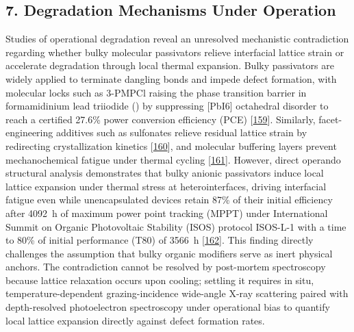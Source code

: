 \documentclass[
  11pt,
]{article}
\begin{document}
\subsection{7. Degradation Mechanisms Under
Operation}\label{degradation-mechanisms-under-operation}

Studies of operational degradation reveal an unresolved mechanistic
contradiction regarding whether bulky molecular passivators relieve
interfacial lattice strain or accelerate degradation through local
thermal expansion. Bulky passivators are widely applied to terminate
dangling bonds and impede defect formation, with molecular locks such as
3-PMPCl raising the phase transition barrier in formamidinium lead
triiodide () by suppressing {[}PbI6{]} octahedral disorder to
reach a certified 27.6\% power conversion efficiency (PCE)
{[}\href{https://doi.org/10.1126/science.aeb9953}{159}{]}. Similarly,
facet-engineering additives such as sulfonates relieve residual lattice
strain by redirecting crystallization kinetics
{[}\href{https://doi.org/10.1002/adma.73539}{160}{]}, and molecular
buffering layers prevent mechanochemical fatigue under thermal cycling
{[}\href{https://doi.org/10.1002/adma.202519339}{161}{]}. However,
direct operando structural analysis demonstrates that bulky anionic
passivators induce local lattice expansion under thermal stress at
heterointerfaces, driving interfacial fatigue even while unencapsulated
devices retain 87\% of their initial efficiency after \qty{4092}{\hour}
of maximum power point tracking (MPPT) under International Summit on
Organic Photovoltaic Stability (ISOS) protocol ISOS-L-1 with a time to
80\% of initial performance (T80) of \qty{3566}{\hour}
{[}\href{https://doi.org/10.1126/sciadv.aef6596}{162}{]}. This finding
directly challenges the assumption that bulky organic modifiers serve as
inert physical anchors. The contradiction cannot be resolved by
post-mortem spectroscopy because lattice relaxation occurs upon cooling;
settling it requires in situ, temperature-dependent grazing-incidence
wide-angle X-ray scattering paired with depth-resolved photoelectron
spectroscopy under operational bias to quantify local lattice expansion
directly against defect formation rates.
\end{document}
